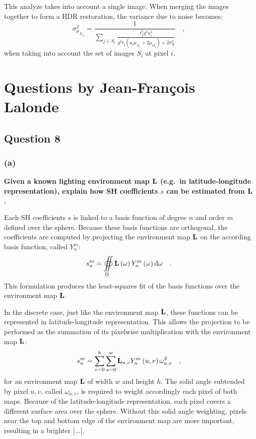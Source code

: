 \documentclass{report}
\begin{document}
This analyze takes into account a single image. When merging the images together to form a HDR restoration, the variance due to noise becomes:
\begin{equation}
\sigma_{\mu_{X_{ij}}}^2 = \frac{1}{\sum_{j \in S_i} \frac{t_j^2 g^2 a_i^2}{g^2 t_j \left( a_i \mu_{X_i} + 2 \mu_{D_i} \right) + 2 \sigma_R^2}} \quad,
\end{equation}
when taking into account the set of images $S_i$ at pixel $i$.

\chapter{Questions by Jean-François Lalonde}

\section{Question 8}
\subsection{(a)}
\textbf{Given a known lighting environment map $\mathbf{L}$ (e.g.\ in latitude-longitude representation), explain how SH coefficients $s$ can be estimated from $\mathbf{L}$.}

Each SH coefficients $s$ is linked to a basis function of degree $n$ and order $m$ defined over the sphere. Because these basis functions are orthogonal, the coefficients are computed by projecting the environment map $\mathbf{L}$ on the according basis function, called $Y_n^m$:
\begin{equation}
s_n^m = \oiint\limits_{\Omega} \mathbf{L}\left(\mathbf{\omega} \right) Y_n^m \left( \mathbf{\omega} \right) \mathrm{d} \mathbf{\omega}   \quad.
\end{equation}
This formulation produces the least-squares fit of the basis functions over the environment map $\mathbf{L}$.

In the discrete case, just like the environment map $\mathbf{L}$, these functions can be represented in latitude-longitude representation. This allows the projection to be performed as the summation of its pixelwise multiplication with the environment map $\mathbf{L}$:
\begin{equation}
s_n^m = \sum_{v=0}^{h} \sum_{u=0}^{w} \mathbf{L}_{u,v} Y_n^m\left(u, v\right) \omega_{u,v}^2 \quad,
\end{equation}
for an environment map $\mathbf{L}$ of width $w$ and height $h$. The solid angle subtended by pixel $u,v$, called $\omega_{u,v}$, is required to weight accordingly each pixel of both maps. Because of the latitude-longitude representation, each pixel covers a different surface area over the sphere. Without this solid angle weighting, pixels near the top and bottom edge of the environment map are more important, resulting in a brighter  [...].
\end{document}

